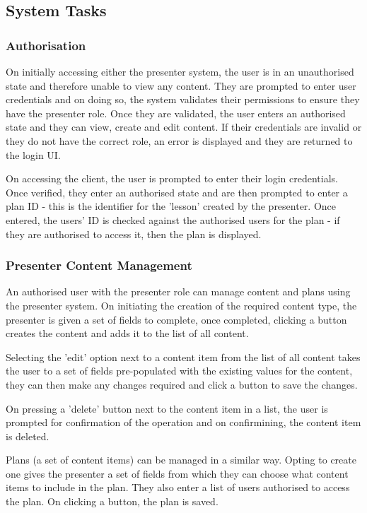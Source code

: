 \documentclass[a4papert,11pt,notitlepage]{ltxdoc}
\begin{document}
\subsection{System Tasks}
\subsubsection{Authorisation}
On initially accessing either the presenter system, the user is in an unauthorised state and therefore unable to view any content. They are prompted to enter user credentials and on doing so, the system validates their permissions to ensure they have the presenter role. Once they are validated, the user enters an authorised state and they can view, create and edit content. If their credentials are invalid or they do not have the correct role, an error is displayed and they are returned to the login UI.

On accessing the client, the user is prompted to enter their login credentials. Once verified, they enter an authorised state and are then prompted to enter a plan ID - this is the identifier for the 'lesson' created by the presenter. Once entered, the users' ID is checked against the authorised users for the plan - if they are authorised to access it, then the plan is displayed.

\subsubsection{Presenter Content Management}
An authorised user with the presenter role can manage content and plans using the presenter system. On initiating the creation of the required content type, the presenter is given a set of fields to complete, once completed, clicking a button creates the content and adds it to the list of all content.

Selecting the 'edit' option next to a content item from the list of all content takes the user to a set of fields pre-populated with the existing values for the content, they can then make any changes required and click a button to save the changes.

On pressing a 'delete' button next to the content item in a list, the user is prompted for confirmation of the operation and on confirmining, the content item is deleted.

Plans (a set of content items) can be managed in a similar way. Opting to create one gives the presenter a set of fields from which they can choose what content items to include in the plan. They also enter a list of users authorised to access the plan. On clicking a button, the plan is saved.
\end{document}
